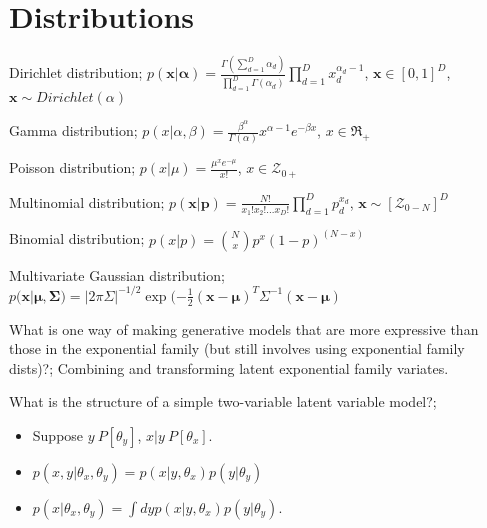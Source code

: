 \documentclass{article}
\begin{document}
	
\section{Distributions}


Dirichlet distribution; $p(\mathbf{x}|\mathbf{\alpha}) = \frac{\Gamma (\sum_{d=1}^{D}\alpha_d)}{\prod_{d=1}^{D}\Gamma(\alpha_d)}\prod_{d=1}^{D}x_d^{\alpha_{d}-1}$, $\mathbf{x}\in [0,1]^D$, $\mathbf{x}\sim Dirichlet(\alpha)$

Gamma distribution; $p(x|\alpha, \beta) = \frac{\beta^{\alpha}}{\Gamma(\alpha)}x^{\alpha-1}e^{-\beta x}$, $x\in \Re_+$

Poisson distribution; $p(x|\mu) = \frac{\mu^xe^{-\mu}}{x!}$, $x\in\mathcal{Z}_{0+}$

Multinomial distribution; $p(\mathbf{x|p})=\frac{N!}{x_1!x_2!...x_D!}\prod_{d=1}^{D}p_d^{x_d}$, $\mathbf{x}\sim [\mathcal{Z}_{0-N}]^D$

Binomial distribution; $p(x|p) = {N\choose x} p^x(1-p)^{(N-x)}$

Multivariate Gaussian distribution; $p(\mathbf{x}|\mathbf{\mu, \Sigma}) = |2\pi\Sigma|^{-1/2}\exp(-\frac{1}{2}(\mathbf{x-\mu})^T\Sigma^{-1}(\mathbf{x-\mu})$

What is one way of making generative models that are more expressive than those in the exponential family (but still involves using exponential family dists)?; Combining and transforming latent exponential family variates.

What is the structure of a simple two-variable latent variable model?; \begin{itemize}
	\item Suppose $y~P[\theta_y]$, $x|y~P[\theta_x]$.
	\item $p(x,y|\theta_x, \theta_y) = p(x|y, \theta_x)p(y|\theta_y)$
	\item $p(x|\theta_x, \theta_y) = \int dy p(x|y, \theta_x) p(y|\theta_y)$.
\end{itemize}
\end{document}
